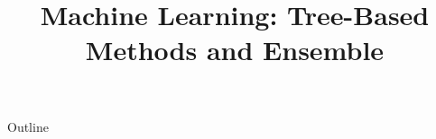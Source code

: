 \documentclass[xcolor=dvipsnames,compress,t,pdf,9pt]{beamer}
\title[\insertframenumber /\inserttotalframenumber]{Machine Learning: Tree-Based Methods and Ensemble}
\begin{document}
	\begin{frame}
	\titlepage
	\end{frame}

	\begin{frame}{Outline}
	    \tableofcontents
	\end{frame}

	
	
	
\end{document}
